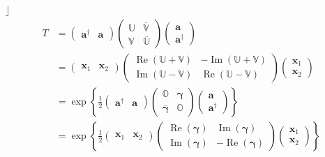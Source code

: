 \documentclass[aps, preprint]{revtex4}
\begin{document}
$\rfloor $
\begin{align}T &  =\left (\begin{array}{cc}\mathbf{a}^{ \dag } & \mathbf{a}\end{array}\right ) \left (\begin{array}{cc}\mathbb{U} & \overline{\mathbb{V}} \\
\mathbb{V} & \overline{\mathbb{U}}\end{array}\right ) \left (\begin{array}{c}\mathbf{a} \\
\mathbf{a}^{ \dag }\end{array}\right ) \\
 &  =\left (\begin{array}{cc}\mathbf{x}_{1} & \mathbf{x}_{2}\end{array}\right ) \left (\begin{array}{cc}\ensuremath{\operatorname*{Re}} \left (\mathbb{U} +\mathbb{V}\right ) &  -\ensuremath{\operatorname*{Im}} \left (\mathbb{U} +\mathbb{V}\right ) \\
\ensuremath{\operatorname*{Im}} \left (\mathbb{U} -\mathbb{V}\right ) & \ensuremath{\operatorname*{Re}} \left (\mathbb{U} -\mathbb{V}\right )\end{array}\right ) \left (\begin{array}{c}\mathbf{x}_{1} \\
\mathbf{x}_{2}\end{array}\right ) \\
 &  =\exp  \left \{\frac{1}{2} \left (\begin{array}{cc}\mathbf{a}^{ \dag } & \mathbf{a}\end{array}\right ) \left (\begin{array}{cc}\mathbb{O} & \mathbf{\gamma } \\
\overline{\mathbf{\gamma }} & \mathbb{O}\end{array}\right ) \left (\begin{array}{c}\mathbf{a} \\
\mathbf{a}^{ \dag }\end{array}\right )\right \} \\
 &  =\exp  \left \{\frac{1}{2} \left (\begin{array}{cc}\mathbf{x}_{1} & \mathbf{x}_{2}\end{array}\right ) \left (\begin{array}{cc}\ensuremath{\operatorname*{Re}} \left (\mathbf{\gamma }\right ) & \ensuremath{\operatorname*{Im}} \left (\mathbf{\gamma }\right ) \\
\ensuremath{\operatorname*{Im}} \left (\mathbf{\gamma }\right ) &  -\ensuremath{\operatorname*{Re}} \left (\mathbf{\gamma }\right )\end{array}\right ) \left (\begin{array}{c}\mathbf{x}_{1} \\
\mathbf{x}_{2}\end{array}\right )\right \}\end{align}
\end{document}
